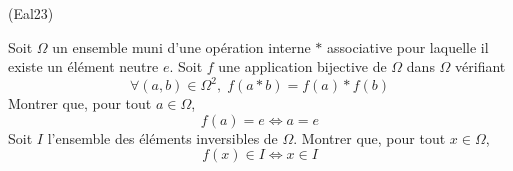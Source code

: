 \begin{tiny}(Eal23)\end{tiny} Soit $\Omega$ un ensemble muni d'une opération interne $*$ associative pour laquelle il existe un élément neutre $e$. Soit $f$ une application bijective de $\Omega$ dans $\Omega$ vérifiant
\begin{displaymath}
\forall(a,b)\in \Omega^2,\; f(a*b) = f(a) * f(b)  
\end{displaymath}
Montrer que, pour tout $a\in \Omega$, 
\begin{displaymath}
  f(a) = e \Leftrightarrow a = e
\end{displaymath}
Soit $I$ l'ensemble des éléments inversibles de $\Omega$. Montrer que, pour tout $x\in \Omega$,
\begin{displaymath}
  f(x)\in I \Leftrightarrow x \in I
\end{displaymath}
